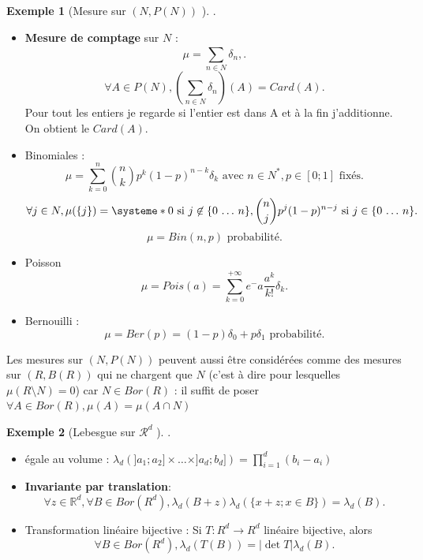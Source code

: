 \documentclass{article}
\theoremstyle{plain}%
\theoremstyle{definition}
\newtheorem{exmp}{Exemple}[section]
\theoremstyle{remark}
\begin{document}
\begin{exmp}[Mesure sur $ (N, P(N)) $ ]
    .\\
    \begin{itemize}
        \item \textbf{Mesure de comptage} sur $ N $ : 
        \[
            \mu = \sum_{n \in N}^{}\delta _n, 
        .\]
        \[
            \forall A \in P(N), (\sum_{n \in N}^{}\delta _n)  (A) = Card(A)
        .\]
        Pour tout les entiers je regarde si l'entier est dans A et à la fin j'additionne. On obtient le $ Card(A) $.
        \item Binomiales : 
        \[
            \mu = \sum_{k=0}^{n} \binom{n}{k} p^k (1-p)^{n-k} \delta _k \text{ avec } n \in N^*, p \in [0;1] \text{ fixés}
        .\]
        \[
            \forall j \in N, \mu (\{j\}) = \systeme*{
                0 \text{ si } j \not\in \{0\, \dots\, n\},
                \binom{n}{j}p^j(1-p)^{n-j} \text{ si } j \in \{0\, \dots\, n\}
            }
        .\]
        \[
            \mu  = Bin(n,p) \text{ probabilité}
        .\]
        \item Poisson 
        \[
            \mu = Pois(a) = \sum_{k=0}^{+ \infty } e^-a \frac{a^k}{k!} \delta _k
        .\]
        \item Bernouilli : 
        \[
            \mu = Ber(p) = (1-p)\delta _0 + p \delta _1 \text{ probabilité}
        .\]
    \end{itemize}
\end{exmp}
Les mesures sur $ (N, P(N)) $ peuvent aussi être considérées comme des mesures sur $ (R, B(R)) $ qui ne chargent que $ N $ (c'est à dire pour lesquelles $ \mu (R \setminus N) = 0 $) car $ N \in Bor(R) $ : il suffit de poser $ \forall A \in Bor(R), \mu (A)= \mu (A \cap N)$

\begin{exmp}[Lebesgue sur $ \mathcal{R}^d $ ]
    .\\
    \begin{itemize}
        \item égale au volume : $ \lambda _d (]a_1;a_2] \times \dots \times ]a_d; b_d]) = \prod_{i=1}^{d} (b_i - a_i) $
        \item \textbf{Invariante par translation}: 
        \[
            \forall z \in \mathbb{R}^d, \forall B \in Bor(R^d), \lambda _d (B+z) \lambda _d (\{x+z;x \in B\})= \lambda _d (B)
        .\]
        \item Transformation linéaire bijective : Si $ T:R^d \to R^d $ linéaire bijective, alors 
        \[
            \forall B \in Bor(R^d), \lambda _d(T(B)) = \left| \det T \right| \lambda _d(B)
        .\]
        
    \end{itemize}
\end{exmp}
\end{document}
